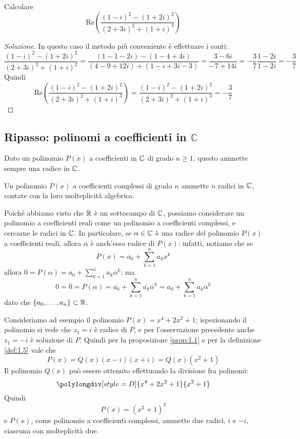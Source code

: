 \begin{exercise}
    \label{ex:3.2}
    Calcolare
    \[
    \mathrm{Re}\left(\frac{(1-i)^2-(1+2i)^2}{(2+3i)^2+(1+i)^3}\right)
    \]
\end{exercise}
\begin{proof}[Soluzione]
    In questo caso il metodo più conveniente è effettuare i conti:
    \[
    \frac{(1-i)^2-(1+2i)^2}{(2+3i)^2+(1+i)^2} = \frac{(1-1-2i)-(1-4+4i)}{(4-9+12i)+(1-i+3i-3)} = \frac{3-6i}{-7+14i} = -\frac{3}{7}\frac{1-2i}{1-2i} = -\frac{3}{7}
    \]
    Quindi
    \[
    \mathrm{Re}\left(\frac{(1-i)^2-(1+2i)^2}{(2+3i)^2+(1+i)^3}\right) = \frac{(1-i)^2-(1+2i)^2}{(2+3i)^2+(1+i)^3} = -\frac{3}{7}
    \]
\end{proof}
\subsection{Ripasso: polinomi a coefficienti in \texorpdfstring{$\mathbb{C}$}{C}}
\begin{theorem}
    \label{th:3.4}
    Dato un polinomio $P(x)$ a coefficienti in $\amsbb{C}$ di grado $n\ge 1$, questo ammette sempre una radice in $\amsbb{C}$. 
\end{theorem}
\begin{corollary}
    \label{cor:3.1}
    Un polinomio $P(x)$ a coefficienti complessi di grado $n$ ammette $n$ radici in $\amsbb{C}$, contate con la loro molteplicità algebrica.
\end{corollary}
\begin{remark}
    Poiché abbiamo visto che $\amsbb{R}$ è un sottocampo di $\amsbb{C}$, possiamo considerare un polinomio a coefficienti reali come un polinomio a coefficienti complessi, e cercarne le radici in $\amsbb{C}$. In particolare, se $\alpha\in\amsbb{C}$ è una radice del polinomio $P(x)$ a coefficienti reali, allora $\overline{\alpha}$ è anch'esso radice di $P(x)$: infatti, notiamo che se 
    \[
    P(x) = a_0 + \sum_{k=1}^n a_k x^k
    \]
    allora $0 = P(\alpha) = a_0 + \sum_{k=1}^n a_k\alpha^k$; ma
    \[
    0 = \overline{0} = \overline{P(\alpha)} = \overline{a_0}+\sum_{k=1}^n \overline{a_k}\overline{\alpha}^k = a_0 + \sum_{k=1}^n a_k \overline{\alpha}^k
    \]
    dato che $\{a_0, \dots, a_n\}\subset\amsbb{R}$.
\end{remark}
\begin{example}
    Consideriamo ad esempio il polinomio $P(x) = x^4+2x^2+1$; ispezionando il polinomio si vede che $z_1 =i$ è radice di $P$, e per l'osservazione precedente anche $z_1 = -i$ è soluzione di $P$. Quindi per la proposizione \ref{prop:1.1} e per la definizione \ref{def:1.5} vale che
    \[
    P(x) = Q(x)(x-i)(x+i) = Q(x)(x^2+1)
    \]
    Il polinomio $Q(x)$ può essere ottenuto effettuando la divisione fra polinomi:
    \[
        \polylongdiv[style=D]{x^4+2x^2+1}{x^2+1}
    \]
    Quindi
    \[
    P(x) = (x^2+1)^2
    \]
    e $P(x)$, come polinomio a coefficienti complessi, ammette due radici, $i$ e $-i$, ciascuna con molteplicità due.
\end{example}
